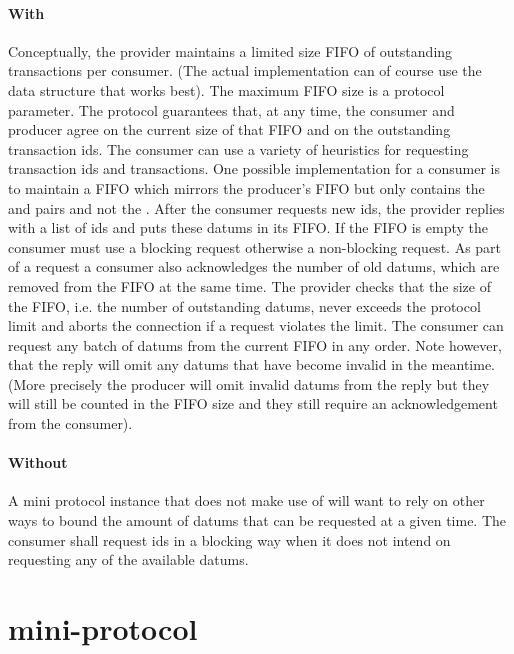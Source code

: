 \paragraph{With \BoundedWindow{}}
Conceptually, the provider maintains a limited size FIFO of outstanding transactions per consumer.
(The actual implementation can of course use the data structure that works best).
The maximum FIFO size is a protocol parameter.
The protocol guarantees that, at any time, the consumer and producer agree on the current size of
that FIFO and on the outstanding transaction ids.
The consumer can use a variety of heuristics for requesting transaction ids and transactions.
One possible implementation for a consumer is to maintain a FIFO which mirrors the producer's FIFO
but only contains the \id{} and \info{} pairs and not the \datum{}.
%
After the consumer requests new ids, the provider replies with a list of ids and
puts these datums in its FIFO. If the FIFO is empty the consumer must use a blocking
request otherwise a non-blocking request.
As part of a request a consumer also acknowledges the number of old datums,
which are removed from the FIFO at the same time.
The provider checks that the size of the FIFO, i.e. the number of outstanding datums,
never exceeds the protocol limit and aborts the connection if a request violates the limit.
The consumer can request any batch of datums from the current FIFO in any order.
Note however, that the reply will omit any datums that have become invalid in the meantime.
(More precisely the producer will omit invalid datums from the reply but they will still be counted in the FIFO
size and they still require an acknowledgement from the consumer).

\paragraph{Without \BoundedWindow{}} A \relay{} mini protocol instance that does not make use of \BoundedWindow{} will want to rely on other ways to bound the amount of datums that can be requested at a given time.
The consumer shall request ids in a blocking way when it does not
intend on requesting any of the available datums.


\section{\fetch{} mini-protocol}
\label{ptcl:fetch}

\renewcommand{\StIdle}{\state{StIdle}}
\renewcommand{\StBusy}{\state{StBusy}}
\newcommand{\StStreaming}{\state{StStreaming}}
\renewcommand{\StDone}{\state{StDone}}
\newcommand{\MsgRequestBodies}{\msg{MsgRequestBodies}}
\newcommand{\MsgStartBatch}{\msg{MsgStartBatch}}
\newcommand{\MsgNoBlocks}{\msg{MsgNoBlocks}}
\newcommand{\MsgBody}{\msg{MsgBody}}
\newcommand{\MsgBatchDone}{\msg{MsgBatchDone}}
\newcommand{\MsgConsumerDone}{\msg{MsgConsumerDone}}
\newcommand{\point}{\text{point}}
\newcommand{\slot}{\text{slot}}
\newcommand{\body}{\text{body}}

